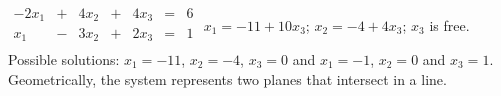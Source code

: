 {$\begin{array}{ccccccc}
-2x_1&+&4x_2&+&4x_3&=&6\\
x_1&-&3x_2&+&2x_3&=&1\\
\end{array}$}
{$x_1=-11+10x_3$; $x_2=-4+4x_3$; $x_3$ is free. Possible solutions: $x_1=-11$, $x_2 = -4$, $x_3=0$ and $x_1 = -1$, $x_2 = 0$ and $x_3 = 1$. Geometrically, the system represents two planes that intersect in a line.}